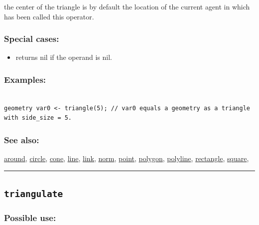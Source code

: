 \documentclass[]{book}
\providecommand{\tightlist}{%
  \setlength{\itemsep}{0pt}\setlength{\parskip}{0pt}}
\theoremstyle{definition}
\theoremstyle{definition}
\theoremstyle{definition}
\theoremstyle{remark}
\begin{document}
the center of the triangle is by default the location of the current
agent in which has been called this operator.

\subsubsection{Special cases:}\label{special-cases-140}

\begin{itemize}
\tightlist
\item
  returns nil if the operand is nil.
\end{itemize}

\subsubsection{Examples:}\label{examples-370}

\begin{verbatim}
 
geometry var0 <- triangle(5); // var0 equals a geometry as a triangle with side_size = 5.
\end{verbatim}

\subsubsection{See also:}\label{see-also-211}

\href{operators-a-to-a.html\#around}{around},
\href{operators-b-to-c.html\#circle}{circle},
\href{operators-b-to-c.html\#cone}{cone},
\href{operators-i-to-m.html\#line}{line},
\href{operators-i-to-m.html\#link}{link},
\href{operators-n-to-r.html\#norm}{norm},
\href{operators-n-to-r.html\#point}{point},
\href{operators-n-to-r.html\#polygon}{polygon},
\href{operators-n-to-r.html\#polyline}{polyline},
\href{operators-n-to-r.html\#rectangle}{rectangle},
\href{operators-s-to-z.html\#square}{square},

\begin{center}\rule{0.5\linewidth}{\linethickness}\end{center}

\subsection{\texorpdfstring{\texttt{triangulate}}{triangulate}}\label{triangulate}

\subsubsection{Possible use:}\label{possible-use-534}
\end{document}
